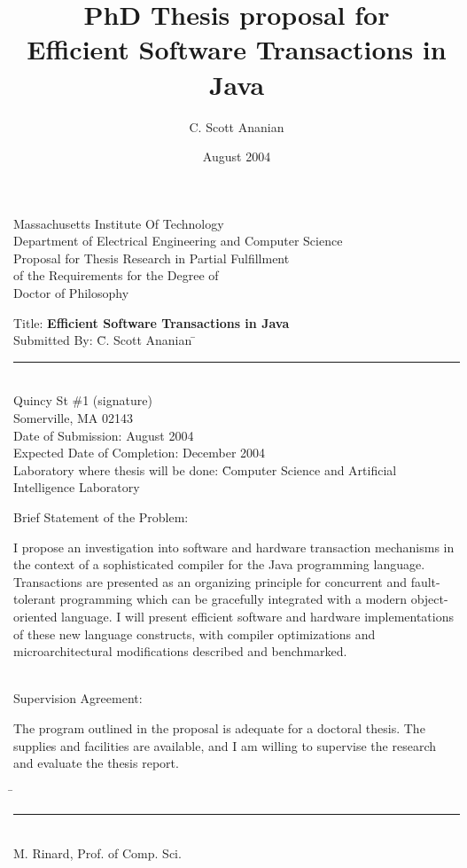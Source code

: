 \documentclass[12pt,twoside]{article}
\title{{\large PhD Thesis proposal for}\\
Efficient Software Transactions in Java}
\author{C. Scott Ananian}
\date{August 2004\\\vspace{5pt}}
\newcommand{\sis}{\linespread{1.0}\setlength{\baselineskip}{0.8\baselineskip}}
\begin{document}

\begin{titlepage}
\sis
\newcommand{\nl}{\\[0.4\baselineskip]}
\newcommand{\tight}{\\[-0.1\baselineskip]}
\newcommand{\tighter}{\\[-0.2\baselineskip]}
\begin{centering}\large
Massachusetts Institute Of Technology\tight
Department of Electrical Engineering and Computer Science\nl
%
Proposal for Thesis Research in Partial Fulfillment\tight
of the Requirements for the Degree of\tight
Doctor of Philosophy\nl
\end{centering}
\vspace{0.05cm}
\begin{tabbing}
Title: \textbf{Efficient Software Transactions in Java}\nl
Submitted By: \= C. Scott Ananian \hspace{3cm}\=\rule{6cm}{0.5pt}\tighter
               Quincy St \#1             \>(signature)\tighter
              \> Somerville, MA 02143\nl
Date of Submission: August 2004\tighter
Expected Date of Completion: December 2004\tighter
Laboratory where thesis will be done: \=Computer Science and Artificial\tighter
\>Intelligence Laboratory%
\end{tabbing}
Brief Statement of the Problem:


I propose an investigation into software and hardware transaction mechanisms
in the context of a sophisticated compiler for the Java
programming language.  Transactions are presented as an organizing
principle for concurrent and fault-tolerant programming which can be
gracefully integrated with a modern object-oriented language.
I will present efficient software and hardware implementations of
these new language constructs, with compiler optimizations and
microarchitectural modifications described and benchmarked.

~\\Supervision Agreement:

The program outlined in the proposal is adequate for a doctoral
thesis.  The supplies and facilities are available, and I am willing
to supervise the research and evaluate the thesis report.

\begin{tabbing}
\hspace{3.5in}\=\kill
\>\rule{2.5in}{0.5pt}\\
\>M. Rinard, Prof. of Comp. Sci.\\
\end{tabbing}

\end{titlepage}
\end{document}
